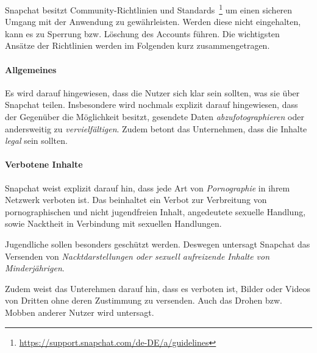 Snapchat besitzt Community-Richtlinien und
Standards~\footnote{\url{https://support.snapchat.com/de-DE/a/guidelines}} um
einen sicheren Umgang mit der Anwendung zu gew\"ahrleisten. Werden diese nicht
eingehalten, kann es zu Sperrung bzw. L\"oschung des Accounts f\"uhren. Die
wichtigsten Ans\"atze der Richtlinien werden im Folgenden kurz
zusammengetragen.

\paragraph{Allgemeines}
Es wird darauf hingewiesen, dass die Nutzer sich klar sein sollten, was sie
\"uber Snapchat teilen. Insbesondere wird nochmals explizit darauf hingewiesen,
dass der Gegen\"uber die M\"oglichkeit besitzt, gesendete Daten
\emph{abzufotographieren} oder andersweitig zu \emph{vervielf\"altigen}. Zudem
betont das Unternehmen, dass die Inhalte \emph{legal} sein sollten.

\paragraph{Verbotene Inhalte}
Snapchat weist explizit darauf hin, dass jede Art von \emph{Pornographie} in
ihrem Netzwerk verboten ist. Das beinhaltet ein Verbot zur Verbreitung von
pornographischen und nicht jugendfreien Inhalt, angedeutete sexuelle Handlung,
sowie Nacktheit in Verbindung mit sexuellen Handlungen.

Jugendliche sollen besonders gesch\"utzt werden. Deswegen untersagt Snapchat
das Versenden von \emph{Nacktdarstellungen oder sexuell aufreizende Inhalte von
Minderj\"ahrigen}.

Zudem weist das Unterehmen darauf hin, dass es verboten ist, Bilder oder Videos
von Dritten ohne deren Zustimmung zu versenden. Auch das Drohen bzw. Mobben
anderer Nutzer wird untersagt.
